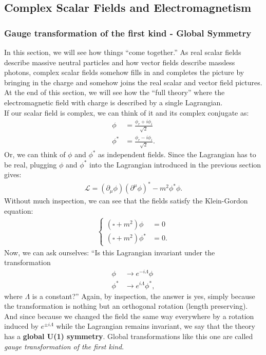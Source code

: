 \documentclass[a4paper,11pt]{article}
\numberwithin{equation}{section}
\theoremstyle{definition}
\newcommand{\p}{\partial}
\newcommand{\lag}{\mathcal{L}}
\begin{document}
\subsection{Complex Scalar Fields and Electromagnetism}
\subsubsection{Gauge transformation of the first kind - Global Symmetry}
In this section, we will see how things ``come together.'' As real scalar fields describe massive neutral particles and how vector fields describe massless photons, complex scalar fields somehow fills in and completes the picture by bringing in the charge and somehow joins the real scalar and vector field pictures. At the end of this section, we will see how the ``full theory'' where the electromagnetic field with charge is described by a single Lagrangian. \\

If our scalar field is complex, we can think of it and its complex conjugate as:
\begin{align*}
\phi &= \frac{\phi_r + i\phi_i}{\sqrt{2}}\\
\phi^* &= \frac{\phi_r - i\phi_i}{\sqrt{2}}.
\end{align*}
Or, we can think of $\phi$ and $\phi^*$ as independent fields. Since the Lagrangian has to be real, plugging $\phi$ and $\phi^*$ into the Lagrangian introduced in the previous section gives:
\begin{align*}
\lag = (\p_\mu \phi)(\p^\mu \phi)^* - m^2\phi^*\phi.
\end{align*}
Without much inspection, we can see that the fields satisfy the Klein-Gordon equation:
\begin{align*}
\begin{cases}
(\square + m^2)\phi &= 0\\
(\square + m^2)\phi^* &= 0.
\end{cases}
\end{align*}
Now, we can ask ourselves: ``Is this Lagrangian invariant under the transformation
\begin{align*}
\phi &\to e^{-i\Lambda}\phi\\
\phi^* &\to e^{i\Lambda}\phi^*,
\end{align*}
where $\Lambda$ is a constant?'' Again, by inspection, the answer is yes, simply because the transformation is nothing but an orthogonal rotation (length preserving). And since because we changed the field the same way everywhere by a rotation induced by $e^{\pm i\Lambda}$ while the Lagrangian remains invariant, we say that the theory has a \textbf{global U(1) symmetry}. Global transformations like this one are called \textit{gauge transformation of the first kind}.
\end{document}
